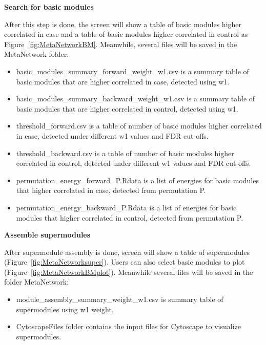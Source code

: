 \textbf{Search for basic modules}

After this step is done, the screen will show a table of basic modules higher correlated in case and a table of basic modules higher correlated in control as Figure~\ref{fig:MetaNetworkBM}. Meanwhile, several files will be saved in the MetaNetwork folder:

\begin{itemize}
 \item basic\_modules\_summary\_forward\_weight\_w1.csv is a summary table of basic modules that are higher correlated in case, detected using w1.
 \item basic\_modules\_summary\_backward\_weight\_w1.csv is a summary table of basic modules that are higher correlated in control, detected using w1.
\item threshold\_forward.csv is a table of number of basic modules higher correlated in case, detected under different w1 values and FDR cut-offs.
\item threshold\_backward.csv is a table of number of basic modules higher correlated in control, detected under different w1 values and FDR cut-offs.
 \item permutation\_energy\_forward\_P.Rdata is a list of energies for basic modules that higher correlated in case, detected from permutation P.
  \item permutation\_energy\_backward\_P.Rdata is a list of energies for basic modules that higher correlated in control, detected from permutation P.
\end{itemize}


\textbf{Assemble supermodules}

After supermodule assembly is done, screen will show a table of supermodules (Figure~\ref{fig:MetaNetworksuper}). Users can also select basic modules to plot (Figure~\ref{fig:MetaNetworkBMplot}). Meanwhile several files will be saved in the folder MetaNetwork:
\begin{itemize}
\item module\_assembly\_summary\_weight\_w1.csv is summary table of supermodules using w1 weight.
\item CytoscapeFiles folder contains the input files for Cytoscape to visualize supermodules.
\end{itemize}

